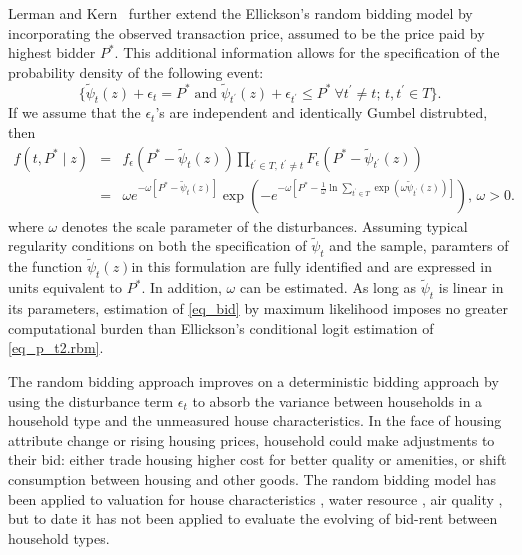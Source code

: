 \documentclass{article}
\begin{document}
Lerman and Kern~\citeyear{Lerman1983} further extend the
Ellickson's random bidding model by incorporating the
observed transaction price, assumed to be the price paid by
highest bidder $P^*$. This additional information allows for
the specification of the probability density of the
following event:
\begin{equation}
\label{eq_price}
\{\tilde{\psi}_t(z)+\epsilon_t = P^* \; \mbox{and} \; \tilde{\psi}_{t^\prime}(z)+\epsilon_{t^\prime} \leq P^* \  \forall{t^\prime} \ne t;\, t, {t^\prime} \in T \}.
\end{equation}
If we assume that the $\epsilon_t$'s are independent and
identically Gumbel distrubted, then
\begin{eqnarray}
\label{eq_bid}
f(t, P^* \mid z) & = & f_\epsilon\left(P^* - \tilde{\psi}_t(z)\right)\prod_{t^\prime \in T,\,t^\prime \ne t}{F_\epsilon\left(P^* - \tilde{\psi}_{t^\prime}(z)\right)} \nonumber\\
& = & \omega e^{-\omega[P^*-\tilde{\psi}_t(z)]}\exp\left( -e^{-\omega[P^*-\frac{1}{\omega}\ln\sum_{t^\prime \in T}{\exp(\omega\tilde{\psi}_{t^\prime}(z))}]} \right), \, \omega > 0.
\end{eqnarray}
where $\omega$ denotes the scale parameter of the
disturbances.  Assuming typical regularity conditions on
both the specification of $\tilde{\psi}_t$ and the sample,
paramters of the function $\tilde{\psi}_t(z)$in this
formulation are fully identified and are expressed in units
equivalent to $P^*$.  In addition, $\omega$ can be
estimated. As long as $\tilde{\psi}_t$ is linear in its
parameters, estimation of \ref{eq_bid} by maximum likelihood
imposes no greater computational burden than Ellickson's
conditional logit estimation of \ref{eq_p_t2.rbm}.

The random bidding approach improves on a deterministic bidding
approach by using the disturbance term $\epsilon_t$ to
absorb the variance between households in a household type
and the unmeasured house characteristics.  In the face of
housing attribute change or rising housing prices, household
could make adjustments to their bid: either trade housing
higher cost for better quality or amenities, or shift
consumption between housing and other goods.  The random bidding
model has been applied to valuation for
house characteristics \cite{Gross1988}, water resource
\cite{North1993}, air quality \cite{Chattopadhyay1998}, but to date
it has not been applied to evaluate the evolving of bid-rent
between household types.
\end{document}
